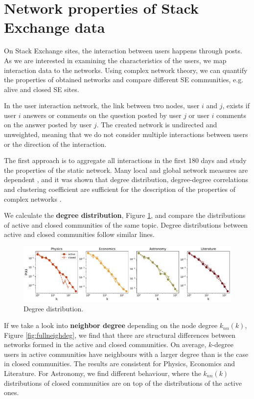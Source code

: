 \section{Network properties of Stack Exchange data}

On Stack Exchange sites, the interaction between users happens through posts. As we are interested in examining the characteristics of the users, we map interaction data to the networks. Using complex network theory, we can quantify the properties of obtained networks and compare different SE communities, e.g. alive and closed SE sites. 

In the user interaction network, the link between two nodes, user $i$ and $j$, exists if user $i$ answers or comments on the question posted by user $j$ or user $i$ comments on the answer posted by user $j$. The created network is undirected and unweighted, meaning that we do not consider multiple interactions between users or the direction of the interaction. 

The first approach is to aggregate all interactions in the first 180 days and study the properties of the static network. Many local and global network measures are dependent 
\cite{boccaletti2006complex}, and it was shown that degree distribution, degree-degree correlations and clustering coefficient are sufficient for the description of the properties of complex networks \cite{orsini2015quantifying}. 

We calculate the \textbf{degree distribution}, Figure \ref{fig:fullnetdeg}, and compare the distributions of active and closed communities of the same topic. Degree distributions between active and closed communities follow similar lines. 

\begin{figure}[ht]
	\centering
	\includegraphics[width=\linewidth]{figures/stackexchange/degree_distribution_fullnet.pdf}
	\caption{Degree distribution.}
	\label{fig:fullnetdeg}
\end{figure}

If we take a look into \textbf{neighbor degree} depending on the node degree $k_{nn}(k)$, Figure \ref{fig:fullneighdeg}, we find that there are structural differences between networks formed in the active and closed communities. On average, $k$-degree users in active communities have neighbours with a larger degree than is the case in closed communities. The results are consistent for Physics, Economics and Literature. For Astronomy, we find different behaviour, where the $k_{nn}(k)$ distributions of closed communities are on top of the distributions of the active ones. 


